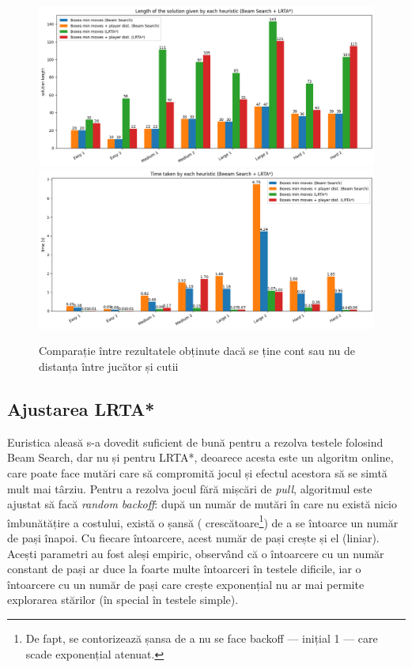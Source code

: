 \documentclass{article}
\begin{document}
\begin{figure}[ht]
    \includegraphics[scale=0.45]{comparison/solution_length.png}
    \includegraphics[scale=0.45]{comparison/time.png}

    \caption{Comparație între rezultatele obținute dacă se ține cont sau nu de 
    distanța între jucător și cutii}
    \label{fig:comparison}
\end{figure}

\subsection{Ajustarea LRTA*}
Euristica aleasă s-a dovedit suficient de bună pentru a rezolva testele 
folosind Beam Search, dar nu și pentru LRTA*, deoarece acesta este un algoritm 
online, care poate face mutări care să compromită jocul și efectul acestora să
se simtă mult mai târziu. Pentru a rezolva jocul fără mișcări de \textit{pull},
algoritmul este ajustat să facă \textit{random backoff}: după un număr de mutări
în care nu există nicio îmbunătățire a costului, există o șansă (
crescătoare\footnote{De fapt, se contorizează șansa de a nu se face backoff --- 
inițial 1 --- care scade exponențial atenuat.}) de a se întoarce un număr de 
pași înapoi. Cu fiecare întoarcere, acest număr de pași crește și el (liniar). 
Acești parametri au fost aleși empiric, observând că o întoarcere cu un număr 
constant de pași ar duce la foarte multe întoarceri în testele dificile, iar o 
întoarcere cu un număr de pași care crește exponențial nu ar mai permite 
explorarea stărilor (în special în testele simple).
\end{document}
